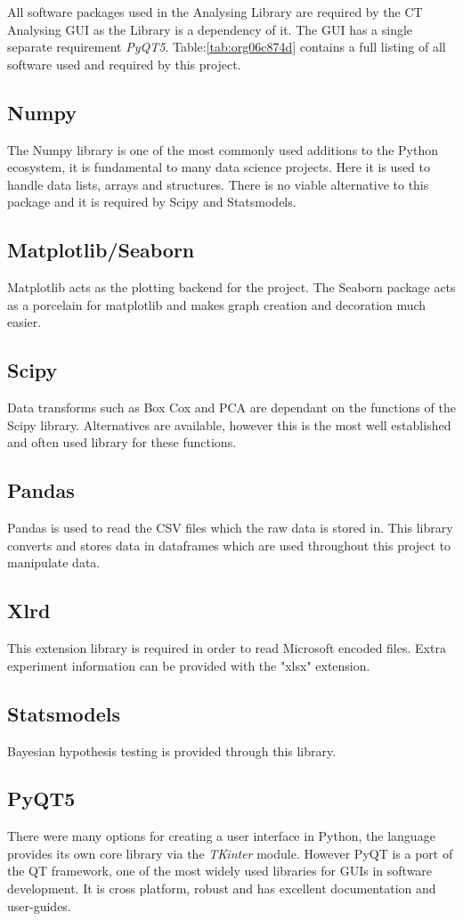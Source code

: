\documentclass[11pt]{report}
\begin{document}
All software packages used in the Analysing Library are required by the CT Analysing GUI as the Library is a dependency of it. The GUI has a single separate requirement \emph{PyQT5}.
Table:\ref{tab:org06c874d} contains a full listing of all software used and required by this project.
\subsection{Numpy}
\label{sec:org313a7e7}
The Numpy library is one of the most commonly used additions to the Python ecosystem, it is fundamental to many data science projects. Here it is used to handle data lists, arrays and structures. There is no viable alternative to this package and it is required by Scipy and Statsmodels.
\subsection{Matplotlib/Seaborn}
\label{sec:orgdccf8ab}
Matplotlib acts as the plotting backend for the project. The Seaborn package acts as a porcelain for matplotlib and makes graph creation and decoration much easier.
\subsection{Scipy}
\label{sec:org8d1faa0}
Data transforms such as Box Cox and PCA are dependant on the functions of the Scipy library. Alternatives are available, however this is the most well established and often used library for these functions.
\subsection{Pandas}
\label{sec:orgffc3cfc}
Pandas is used to read the CSV files which the raw data is stored in. This library converts and stores data in dataframes which are used throughout this project to manipulate data.
\subsection{Xlrd}
\label{sec:org9510671}
This extension library is required in order to read Microsoft encoded files. Extra experiment information can be provided with the "xlsx" extension.
\subsection{Statsmodels}
\label{sec:org73438ef}
Bayesian hypothesis testing is provided through this library.
\subsection{PyQT5}
\label{sec:org44a3d17}
There were many options for creating a user interface in Python, the language provides its own core library via the \emph{TKinter} module. However PyQT is a port of the QT framework, one of the most widely used libraries for GUIs in software development. It is cross platform, robust and has excellent documentation and user-guides.
\end{document}
